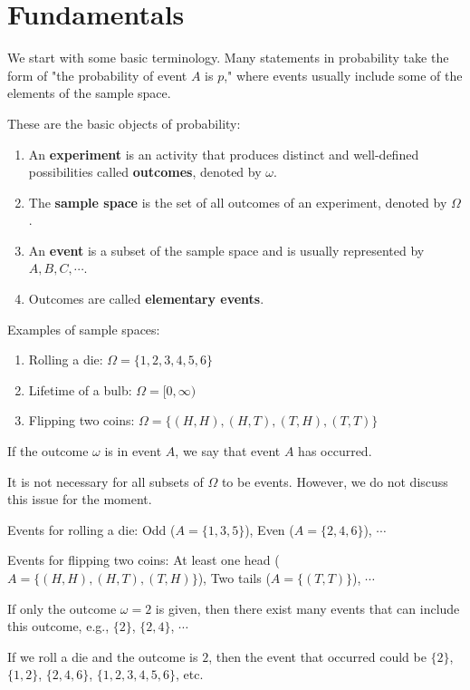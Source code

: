 \documentclass{huhtakm-template-book-v2}
\begin{document}
\section{Fundamentals}
    We start with some basic terminology. Many statements in probability take the form of "the probability of event $A$ is $p$," where events usually include some of the elements of the sample space.
    \begin{defn}
        These are the basic objects of probability:
        \begin{enumerate}
            \item An \textbf{experiment} is an activity that produces distinct and well-defined possibilities called \textbf{outcomes}, denoted by $\omega$.
            \item The \textbf{sample space} is the set of all outcomes of an experiment, denoted by $\Omega$.
            \item An \textbf{event} is a subset of the sample space and is usually represented by $A,B,C,\cdots$.
            \item Outcomes are called \textbf{elementary events}.
        \end{enumerate}
    \end{defn}
    \begin{eg}
        Examples of sample spaces:
        \begin{enumerate}
            \item Rolling a die: $\Omega = \{1,2,3,4,5,6\}$
            \item Lifetime of a bulb: $\Omega = [0,\infty)$
            \item Flipping two coins: $\Omega = \{(H,H),(H,T),(T,H),(T,T)\}$
        \end{enumerate} 
    \end{eg}
    \begin{rem}
        If the outcome $\omega$ is in event $A$, we say that event $A$ has occurred.
    \end{rem}
    \begin{rem}
        It is not necessary for all subsets of $\Omega$ to be events. However, we do not discuss this issue for the moment.
    \end{rem}
    \begin{eg}
        Events for rolling a die: Odd ($A = \{1,3,5\}$), Even ($A = \{2,4,6\}$), $\cdots$
    \end{eg}
    \begin{eg}
        Events for flipping two coins: At least one head ($A = \{(H,H),(H,T),(T,H)\}$), Two tails ($A = \{(T,T)\}$), $\cdots$
    \end{eg}
    \begin{rem}
        If only the outcome $\omega = 2$ is given, then there exist many events that can include this outcome, e.g., $\{2\}$, $\{2,4\}$, $\cdots$
    \end{rem}
    \begin{eg}
        If we roll a die and the outcome is $2$, then the event that occurred could be $\{2\}$, $\{1,2\}$, $\{2,4,6\}$, $\{1,2,3,4,5,6\}$, etc.
    \end{eg}
    \newpage
\end{document}
